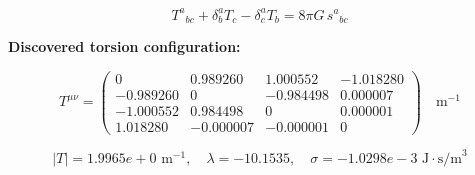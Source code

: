 
\begin{equation}
  T^a{}_{bc} + \delta^a_b T_c - \delta^a_c T_b = 8\pi G \, s^a{}_{bc}
\end{equation}

\textbf{Discovered torsion configuration:}

\begin{equation}
  T^{\mu\nu} = \begin{pmatrix}
    0 & 0.989260 & 1.000552 & -1.018280 \\
    -0.989260 & 0 & -0.984498 & 0.000007 \\
    -1.000552 & 0.984498 & 0 & 0.000001 \\
    1.018280 & -0.000007 & -0.000001 & 0
  \end{pmatrix} \quad \text{m}^{-1}
\end{equation}

\begin{equation}
  |T| = 1.9965e+0 \text{ m}^{-1}, \quad
  \lambda = -10.1535, \quad
  \sigma = -1.0298e-3 \text{ J}\cdot\text{s/m}^3
\end{equation}